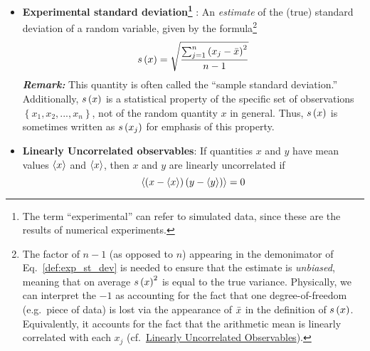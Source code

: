 \begin{itemize}
\item {\bf Experimental standard deviation\footnote{
      The term ``experimental'' can refer to simulated data, since these are the results of numerical experiments.
}
}: An \emph{estimate} of the (true) standard deviation of a random variable, given by the formula\footnote{The factor of $n-1$ (as opposed to $n$) appearing in the demonimator of Eq.~\ref{def:exp_st_dev} is needed to ensure that the estimate is {\it unbiased}, meaning that on average $s\left( x \right)^2$ is equal to the true variance. Physically, we can interpret the $-1$ as accounting for the fact that one degree-of-freedom (e.g.\ piece of data) is lost via the appearance of $\bar{x}$ in the definition of $s\left( x \right)$.  Equivalently, it accounts for the fact that the arithmetic mean is linearly correlated with each $x_j$ (cf.\ \hyperref[def:unc_obs]{Linearly Uncorrelated Observables}).}
  \begin{equation}
    s\left( x \right) = \sqrt{\dfrac{\sum_{j=1}^n\left(x_j - \bar{x}\right)^2}{n-1}} \label{def:exp_st_dev}
  \end{equation}
  \smallskip
  \textbf{\textit{Remark:}} This quantity is often called the ``sample standard deviation.''
  Additionally, $s\left( x \right)$ is a statistical property of the specific set of observations $\left\{x_1,x_2,...,x_n\right\}$, not of the random quantity $x$ in general.
  Thus, $s\left( x \right)$ is sometimes written as $s\left( x_j \right)$ for emphasis of this property.

  \item {\bf Linearly Uncorrelated observables}:  If quantities $x$ and $y$ have mean values $\langle x \rangle$ and $\langle x \rangle$, then $x$ and $y$ are linearly uncorrelated if
\begin{equation}
  \langle  \left(x - \langle x \rangle \right) \left(y - \langle y \rangle \right)  \rangle = 0 \label{def:unc_obs}
\end{equation}


\end{itemize}
